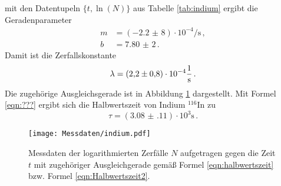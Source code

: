 mit den Datentupeln $\{ t, \ln (N)\}$ aus Tabelle \ref{tab:indium} ergibt die Geradenparameter
\begin{align*}
	m &= (-\num{2,2(8)}) \cdot 10^{-4} \si{\per\second}  \, \mathrm{,} \\
	b &= \num{7,80(2)} \, \mathrm{.}
\end{align*}
Damit ist die Zerfallskonstante
\begin{equation*}
	\lambda = (\num{2,2(8)}) \cdot 10^{-4} \si{\per\second}  \, \mathrm{.} \\
\end{equation*}
Die zugehörige Ausgleichsgerade ist in Abbildung \ref{fig:indium} dargestellt.
Mit Formel \eqref{eqn:???} ergibt sich die Halbwertszeit von Indium $^{116}\mathrm{In}$
zu
\begin{equation*}
	\tau =  (\num{3.08(11)}) \cdot 10^3 \si{\second} \, \mathrm{.}
\end{equation*}
\begin{figure}
	\centering
	\texttt{[image: Messdaten/indium.pdf]}
	\caption{Messdaten der logarithmierten Zerfälle $N$ aufgetragen gegen die Zeit $t$ mit zugehöriger Ausgleichgerade gemäß Formel \eqref{eqn:halbwertszeit} bzw. Formel \eqref{eqn:Halbwertszeit2}.}
	\label{fig:indium}
\end{figure}






%
%
%
%



